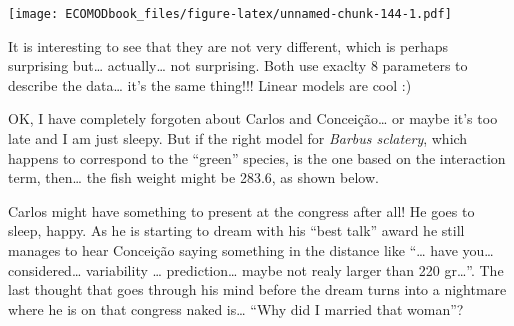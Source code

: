 \documentclass[
]{book}
\newenvironment{Shaded}{\begin{snugshade}}{\end{snugshade}}
\newcommand{\DataTypeTok}[1]{\textcolor[rgb]{0.13,0.29,0.53}{#1}}
\newcommand{\DecValTok}[1]{\textcolor[rgb]{0.00,0.00,0.81}{#1}}
\newcommand{\KeywordTok}[1]{\textcolor[rgb]{0.13,0.29,0.53}{\textbf{#1}}}
\newcommand{\NormalTok}[1]{#1}
\newcommand{\OperatorTok}[1]{\textcolor[rgb]{0.81,0.36,0.00}{\textbf{#1}}}
\begin{document}
\begin{Shaded}
\end{Shaded}

\texttt{[image: ECOMODbook\_files/figure-latex/unnamed-chunk-144-1.pdf]}

It is interesting to see that they are not very different, which is perhaps surprising but\ldots{} actually\ldots{} not surprising. Both use exaclty 8 parameters to describe the data\ldots{} it's the same thing!!! Linear models are cool :)

OK, I have completely forgoten about Carlos and Conceição\ldots{} or maybe it's too late and I am just sleepy. But if the right model for \emph{Barbus sclatery}, which happens to correspond to the ``green'' species, is the one based on the interaction term, then\ldots{} the fish weight might be 283.6, as shown below.

Carlos might have something to present at the congress after all! He goes to sleep, happy. As he is starting to dream with his ``best talk'' award he still manages to hear Conceição saying something in the distance like ``\ldots{} have you\ldots{} considered\ldots{} variability \ldots{} prediction\ldots{} maybe not realy larger than 220 gr\ldots{}''. The last thought that goes through his mind before the dream turns into a nightmare where he is on that congress naked is\ldots{} ``Why did I married that woman''?
\end{document}
